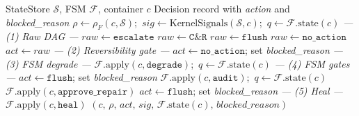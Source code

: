 \documentclass[conference]{IEEEtran}
\begin{document}
\begin{algorithm}
\caption{Type~F FSM-Gated Reconciliation (single container $c$)}
\label{alg:reconcile}
\begin{algorithmic}[1]
\REQUIRE StateStore $\mathcal{S}$, FSM $\mathcal{F}$, container $c$
\ENSURE Decision record with \textit{action} and \textit{blocked\_reason}
\STATE $\rho \leftarrow \rho_F(c, \mathcal{S})$;\ $\mathit{sig} \leftarrow \mathrm{KernelSignals}(\mathcal{S}, c)$;\ $q \leftarrow \mathcal{F}.\mathrm{state}(c)$
\STATE \textit{--- (1) Raw DAG ---}
    \STATE $\mathit{raw} \leftarrow \texttt{escalate}$
    \STATE $\mathit{raw} \leftarrow \texttt{C\&R}$
    \STATE $\mathit{raw} \leftarrow \texttt{flush}$
\ELSE
    \STATE $\mathit{raw} \leftarrow \texttt{no\_action}$
\ENDIF
\STATE $\mathit{act} \leftarrow \mathit{raw}$
\STATE \textit{--- (2) Reversibility gate ---}
    \STATE $\mathit{act} \leftarrow \texttt{no\_action}$; set \textit{blocked\_reason}
\ENDIF
\STATE \textit{--- (3) FSM degrade ---}
    \STATE $\mathcal{F}.\mathrm{apply}(c, \texttt{degrade})$;\ $q \leftarrow \mathcal{F}.\mathrm{state}(c)$
\ENDIF
\STATE \textit{--- (4) FSM gates ---}
    \STATE $\mathit{act} \leftarrow \texttt{flush}$; set \textit{blocked\_reason} 
\ENDIF
{}
    \STATE $\mathcal{F}.\mathrm{apply}(c, \texttt{audit})$;\ $q \leftarrow \mathcal{F}.\mathrm{state}(c)$ 
\ENDIF
{}
    \STATE $\mathcal{F}.\mathrm{apply}(c, \texttt{approve\_repair})$ 
\ENDIF
{}
    \STATE $\mathit{act} \leftarrow \texttt{flush}$; set \textit{blocked\_reason} 
\ENDIF
\STATE \textit{--- (5) Heal ---}
    \STATE $\mathcal{F}.\mathrm{apply}(c, \texttt{heal})$ 
\ENDIF
\RETURN $(c,\, \rho,\, \mathit{act},\, \mathit{sig},\, \mathcal{F}.\mathrm{state}(c),\, \mathit{blocked\_reason})$
\end{algorithmic}
\end{algorithm}
\end{document}
